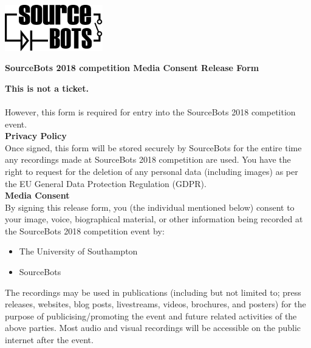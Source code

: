 \documentclass[a4paper]{article}
\begin{document}
\newcommand{\eventyear}{2018\xspace}
\newcommand{\event}{SourceBots \eventyear competition\xspace}

\begin{minipage}[c]{0.30\textwidth}
\includegraphics[height=2cm]{fig-SourceBots}
\end{minipage}
\hspace{0.03\textwidth}
\begin{minipage}[c]{0.67\textwidth}
\begin{center}
{\large \textbf{\event Media Consent Release Form} \par}
\end{center}
\end{minipage}
\vspace{1cm}

\textbf{This is not a ticket.}\\\\ However, this form is required for entry into the \event event.\\

\vspace{0.3cm}
\textbf{\large Privacy Policy}\\

Once signed, this form will be stored securely by SourceBots for the entire time any recordings made at \event are used. You have the right to request for the deletion of any personal data (including images) as per the EU General Data Protection Regulation (GDPR).\\

\vspace{0.3cm}
\textbf{\large Media Consent}\\

By signing this release form, you (the individual mentioned below) consent to your image, voice, biographical material, or other information being recorded at the \event event by:
\begin{itemize}
    \item The University of Southampton
    \item SourceBots
\end{itemize}
 The recordings may be used in publications (including but not limited to; press releases, websites, blog posts, livestreams, videos, brochures, and posters) for the purpose of publicising/promoting the event and future related activities of the above parties. Most audio and visual recordings will be accessible on the public internet after the event.
\end{document}
